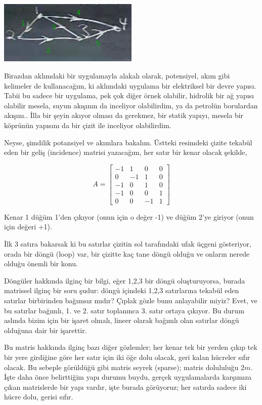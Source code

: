 \documentclass[12pt,fleqn]{article}\usepackage{../../common}
\begin{document}
\includegraphics[height=3cm]{12_2.png}

Birazdan aklımdaki bir uygulamayla alakalı olarak, potensiyel, akım gibi
kelimeler de kullanacağım, ki aklımdaki uygulama bir elektriksel bir devre
yapısı. Tabii bu sadece bir uygulama, pek çok diğer örnek olabilir,
hidrolik bir ağ yapısı olabilir mesela, suyun akışının da inceliyor
olabilirdim, ya da petrolün borulardan akışını.. İlla bir şeyin akıyor
olması da gerekmez, bir statik yapıyı, mesela bir köprünün yapısını da bir
çizit ile inceliyor olabilirdim.

Neyse, şimdilik potansiyel ve akımlara bakalım. Üstteki resimdeki çizite
tekabül eden bir geliş (incidence) matrisi yazacağım, her satır bir kenar
olacak şekilde,

$$ 
A = 
\left[\begin{array}{rrrr}
-1 & 1 & 0 & 0 \\
0 & -1 & 1  & 0 \\
-1  & 0  & 1  & 0 \\
-1 & 0 & 0 & 1 \\
0 & 0 & -1 & 1
\end{array}\right]
 $$

Kenar 1 düğüm 1'den çıkıyor (onun için o değer -1) ve düğüm 2'ye giriyor
(onun için değeri +1). 

İlk 3 satıra bakarsak ki bu satırlar çizitin sol tarafındaki ufak üçgeni
gösteriyor, orada bir döngü (loop) var, bir çizitte kaç tane döngü olduğu
ve onların nerede olduğu önemli bir konu.

Döngüler hakkında ilginç bir bilgi, eğer 1,2,3 bir döngü oluşturuyorsa,
burada matrissel ilginç bir soru şudur: döngü içindeki 1,2,3 satırlarına
tekabül eden satırlar birbirinden bağımsız mıdır? Çıplak gözle bunu
anlayabilir miyiz? Evet, ve bu satırlar bağımlı, 1. ve 2. satır toplanınca
3. satır ortaya çıkıyor. Bu durum aslında bizim için bir işaret olmalı,
lineer olarak bağımlı olan satırlar döngü olduğuna dair bir işarettir.

Bu matris hakkında ilginç bazı diğer gözlemler; her kenar tek bir yerden
çıkıp tek bir yere girdiğine göre her satır için iki öğe dolu olacak, geri
kalan hücreler sıfır olacak. Bu sebeple görüldüğü gibi matris seyrek
(sparse); matris dolululuğu $2m$. İşte daha önce belirttiğim yapı durumu
buydu, gerçek uygulamalarda karşımıza çıkan matrislerde bir yapı vardır,
işte burada görüyoruz; her satırda sadece iki hücre dolu, gerisi sıfır.
\end{document}
